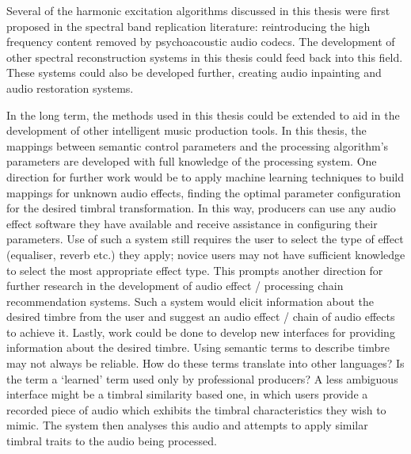 	Several of the harmonic excitation algorithms discussed in this thesis were first proposed in the spectral band
	replication literature: reintroducing the high frequency content removed by psychoacoustic audio codecs. The
	development of other spectral reconstruction systems in this thesis could feed back into this field. These systems
	could also be developed further, creating audio inpainting and audio restoration systems.

	In the long term, the methods used in this thesis could be extended to aid in the development of other intelligent
	music production tools. In this thesis, the mappings between semantic control parameters and the processing
	algorithm's parameters are developed with full knowledge of the processing system. One direction for further work
	would be to apply machine learning techniques to build mappings for unknown audio effects, finding the optimal
	parameter configuration for the desired timbral transformation. In this way, producers can use any audio effect
	software they have available and receive assistance in configuring their parameters. Use of such a system still
	requires the user to select the type of effect (equaliser, reverb etc.) they apply; novice users may not have
	sufficient knowledge to select the most appropriate effect type. This prompts another direction for further research
	in the development of audio effect / processing chain recommendation systems. Such a system would elicit information
	about the desired timbre from the user and suggest an audio effect / chain of audio effects to achieve it. Lastly,
	work could be done to develop new interfaces for providing information about the desired timbre. Using semantic
	terms to describe timbre may not always be reliable. How do these terms translate into other languages? Is the term
	a `learned' term used only by professional producers? A less ambiguous interface might be a timbral similarity based
	one, in which users provide a recorded piece of audio which exhibits the timbral characteristics they wish to mimic.
	The system then analyses this audio and attempts to apply similar timbral traits to the audio being processed.
